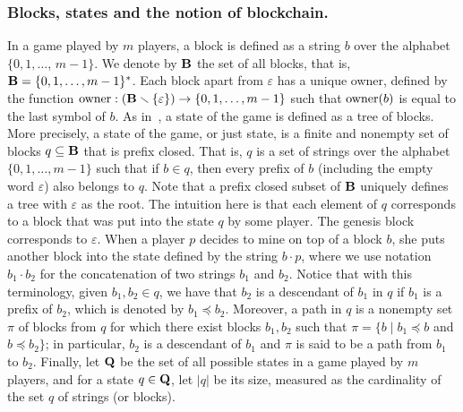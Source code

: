 \subsubsection{Blocks, states and the notion of blockchain.}\label{sub:states}
In a game played by $m$ players, a block is defined as a string $b$ over the alphabet $\{0,1,\ldots$, $m-1\}$. We denote by $\mathbf{B}$ the set of all blocks, that is, $\mathbf{B} = \{0,1,\ldots , m-1\}^*$. Each block apart from $\varepsilon$ has a unique owner, defined by the function $\text{\rm owner}: (\mathbf{B} \smallsetminus \{\varepsilon\}) \rightarrow \{0,1, \ldots ,m-1\}$ such that $\text{\rm owner}(b)$ is equal to the last symbol of $b$. As in~\cite{mininggames:2016}, a state of the game is defined as a tree of blocks. More precisely, a state of the game, or just state, is a finite and nonempty set of blocks $q \subseteq \mathbf{B}$ that is prefix closed. That is, $q$ is a set of strings over the alphabet $\{0,1,\ldots, m-1\}$ such that if $b\in q$, then every prefix of $b$ (including the empty word $\varepsilon$) also belongs to $q$. Note that a prefix closed subset of $\mathbf{B}$ uniquely defines a tree with $\varepsilon$ as the root.
%
The intuition here is that each element of $q$ corresponds to a block that was put into the state $q$ by some player. The genesis block corresponds to $\varepsilon$. When a player $p$ decides to mine on top of a block $b$, she puts another block into the state defined by the string $b\cdot p$, where we use notation $b_1 \cdot b_2$ for the concatenation of two strings $b_1$ and $b_2$.
%
Notice that with this terminology, given $b_1, b_2 \in q$, we have that $b_2$ is a descendant of $b_1$ in $q$ if $b_1$ is a prefix of $b_2$, which is denoted by $b_1 \preceq b_2$. Moreover, a path in $q$ is a nonempty set $\pi$ of blocks from $q$ for which there exist blocks $b_1, b_2$ such that $\pi = \{ b \mid b_1 \preceq b$ and $b \preceq b_2\}$; in particular, $b_2$ is a descendant of $b_1$ and $\pi$ is said to be a path from $b_1$ to $b_2$.
Finally, let $\mathbf{Q}$ be the set of all possible states in a game played by $m$ players, and for a state $q \in \mathbf{Q}$, let $|q|$ be its size, measured as the cardinality of the set $q$ of strings (or blocks).

